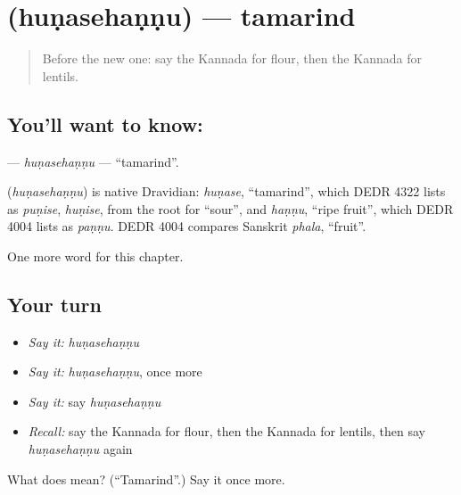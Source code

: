 \section[\texorpdfstring{\kn{ಹುಣಸೆಹಣ್ಣು} (huṇasehaṇṇu)}{ಹುಣಸೆಹಣ್ಣು (huṇasehaṇṇu)}]{ (huṇasehaṇṇu) — tamarind}

\label{lesson:KA-C257-hunasehannu}



\begin{quote}
Before the new one: say the Kannada for flour, then the Kannada for lentils.
\end{quote}

\subsection*{You'll want to know: }
\textbf{} — \emph{huṇasehaṇṇu} — \textquotedblleft{}tamarind\textquotedblright{}.

\begin{cousinweb}
\textbf{} (\emph{huṇasehaṇṇu}) is native Dravidian: \emph{huṇase}, \textquotedblleft{}tamarind\textquotedblright{}, which DEDR 4322 lists as \emph{puṇise}, \emph{huṇise}, from the root for \textquotedblleft{}sour\textquotedblright{}, and \emph{haṇṇu}, \textquotedblleft{}ripe fruit\textquotedblright{}, which DEDR 4004 lists as \emph{paṇṇu}. DEDR 4004 compares Sanskrit \emph{phala}, \textquotedblleft{}fruit\textquotedblright{}.
\end{cousinweb}

\begin{grammarlens}[title={What you've built}]
One more word for this chapter.
\end{grammarlens}

\subsection*{Your turn}
\begin{itemize}
\raggedright
  \item \emph{Say it:} \emph{huṇasehaṇṇu}
  \item \emph{Say it:} \emph{huṇasehaṇṇu}, once more
  \item \emph{Say it:} say \emph{huṇasehaṇṇu}
  \item \emph{Recall:} say the Kannada for flour, then the Kannada for lentils, then say \emph{huṇasehaṇṇu} again
\end{itemize}

\begin{tcolorbox}[breakable,colback=teal!4,colframe=teal!35!black,title={Before you move on}]
What does  mean? (\textquotedblleft{}Tamarind\textquotedblright{}.) Say it once more.
\end{tcolorbox}
